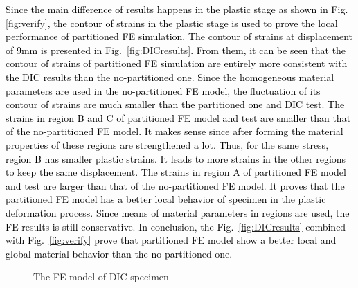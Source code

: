 \documentclass[review]{elsarticle}
\begin{document}
\textcolor{black}{Since the main difference of results happens in the plastic stage as shown in Fig.\ref{fig:verify}, the contour of strains in the plastic stage is used to prove the local performance of partitioned FE simulation. The contour of strains at displacement of 9mm is presented in Fig.~\ref{fig:DICresults}. From them, it can be seen that the contour of strains of partitioned FE simulation are entirely more consistent with the DIC results than the no-partitioned one. Since the homogeneous material parameters are used in the no-partitioned FE model, the fluctuation of its contour of strains are much smaller than the partitioned one and DIC test. The strains in region B and C of partitioned FE model and test are smaller than that of the no-partitioned FE model. It makes sense since after forming the material properties of these regions are strengthened a lot. Thus, for the same stress, region B has smaller plastic strains. It leads to more strains in the other regions to keep the same displacement. The strains in region A of partitioned FE model and test are larger than that of the no-partitioned FE model. It proves that the partitioned FE model has a better local behavior of specimen in the plastic deformation process. Since means of material parameters in regions are used, the FE results is still conservative. In conclusion, the Fig.~\ref{fig:DICresults} combined with Fig.~\ref{fig:verify} prove that partitioned FE model show a better local and global material behavior than the no-partitioned one.}

\begin{figure}[h!]
\centering
{}

\caption{The FE model of DIC specimen}
\label{fig:DIC-FE}
\end{figure}
\end{document}
